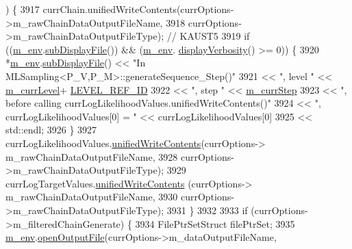 \begin{DoxyCode}
      ) \{
3917     currChain.unifiedWriteContents(currOptions->m\_rawChainDataOutputFileName,
3918                                    currOptions->m\_rawChainDataOutputFileType); \textcolor{comment}{// KAUST5}
3919     \textcolor{keywordflow}{if} ((\hyperlink{class_q_u_e_s_o_1_1_m_l_sampling_a13f1ca4fe9f94822fe572a743eaced1d}{m\_env}.\hyperlink{class_q_u_e_s_o_1_1_base_environment_a8a0064746ae8dddfece4229b9ad374d6}{subDisplayFile}()) && (\hyperlink{class_q_u_e_s_o_1_1_m_l_sampling_a13f1ca4fe9f94822fe572a743eaced1d}{m\_env}.
      \hyperlink{class_q_u_e_s_o_1_1_base_environment_a1fe5f244fc0316a0ab3e37463f108b96}{displayVerbosity}() >= 0)) \{
3920       *\hyperlink{class_q_u_e_s_o_1_1_m_l_sampling_a13f1ca4fe9f94822fe572a743eaced1d}{m\_env}.\hyperlink{class_q_u_e_s_o_1_1_base_environment_a8a0064746ae8dddfece4229b9ad374d6}{subDisplayFile}() << \textcolor{stringliteral}{"In MLSampling<P\_V,P\_M>::generateSequence\_Step()"}
3921                               << \textcolor{stringliteral}{", level "} << \hyperlink{class_q_u_e_s_o_1_1_m_l_sampling_af9416874c856e50f3b35270e801f17e4}{m\_currLevel}+
      \hyperlink{_m_l_sampling_level_options_8h_a68d15eaf394d210effcf584b938206d3}{LEVEL\_REF\_ID}
3922                               << \textcolor{stringliteral}{", step "}  << \hyperlink{class_q_u_e_s_o_1_1_m_l_sampling_a1b1f8ccb4823bdfa26ec652f0807c63e}{m\_currStep}
3923                               << \textcolor{stringliteral}{", before calling currLogLikelihoodValues.unifiedWriteContents()"}
3924                               << \textcolor{stringliteral}{", currLogLikelihoodValues[0] = "} << currLogLikelihoodValues[0]
3925                               << std::endl;
3926     \}
3927     currLogLikelihoodValues.\hyperlink{class_q_u_e_s_o_1_1_scalar_sequence_a2f832dd5eda37df06eb52650ab8ce733}{unifiedWriteContents}(currOptions->
      m\_rawChainDataOutputFileName,
3928                                                  currOptions->m\_rawChainDataOutputFileType);
3929     currLogTargetValues.\hyperlink{class_q_u_e_s_o_1_1_scalar_sequence_a2f832dd5eda37df06eb52650ab8ce733}{unifiedWriteContents}    (currOptions->
      m\_rawChainDataOutputFileName,
3930                                                  currOptions->m\_rawChainDataOutputFileType);
3931   \}
3932 
3933   \textcolor{keywordflow}{if} (currOptions->m\_filteredChainGenerate) \{
3934     FilePtrSetStruct filePtrSet;
3935     \hyperlink{class_q_u_e_s_o_1_1_m_l_sampling_a13f1ca4fe9f94822fe572a743eaced1d}{m\_env}.\hyperlink{class_q_u_e_s_o_1_1_base_environment_ab8fe853074f12ea34e18724119a2fc75}{openOutputFile}(currOptions->m\_dataOutputFileName,

\end{DoxyCode}
